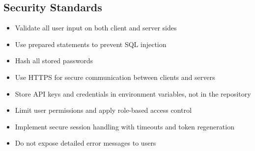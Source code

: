 \documentclass[10pt,titlepage]{article}
\begin{document}
	\subsection*{Security Standards}
	\begin{itemize}
		\item Validate all user input on both client and server sides
		\item Use prepared statements to prevent SQL injection
		\item Hash all stored passwords
		\item Use HTTPS for secure communication between clients and servers
		\item Store API keys and credentials in environment variables, not in the repository
		\item Limit user permissions and apply role-based access control
		\item Implement secure session handling with timeouts and token regeneration
		\item Do not expose detailed error messages to users
	\end{itemize}
	
\end{document}

